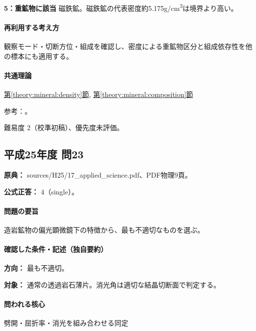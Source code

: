 \noindent\textbf{5：重鉱物に該当} 磁鉄鉱。磁鉄鉱の代表密度約5.175g/cm\textsuperscript{3}は境界より高い。\par

\paragraph{再利用する考え方} 観察モード・切断方位・組成を確認し、密度による重鉱物区分と組成依存性を他の標本にも適用する。

\paragraph{共通理論} \hyperref[theory:mineral:density]{第\ref*{theory:mineral:density}節}, \hyperref[theory:mineral:composition]{第\ref*{theory:mineral:composition}節}

\par 参考：\cite{hom_biotite,hom_quartz,hom_forsterite,hom_augite,hom_magnetite}。

\par 難易度 2（校準初稿）、優先度未評価。

\subsection{平成25年度 問23}
\label{q:h25-reg-applied-23}

\noindent\textbf{原典：} sources/H25/17\_applied\_science.pdf、PDF物理9頁。

\textbf{公式正答：} 4（single）。

\paragraph{問題の要旨} 造岩鉱物の偏光顕微鏡下の特徴から、最も不適切なものを選ぶ。

\paragraph{確認した条件・記述（独自要約）}\mbox{}\par

\noindent\textbf{方向：} 最も不適切。\par

\noindent\textbf{対象：} 通常の透過岩石薄片。消光角は適切な結晶切断面で判定する。\par

\paragraph{問われる核心} 劈開・屈折率・消光を組み合わせる同定

